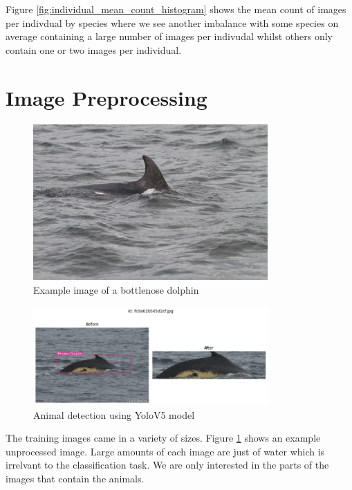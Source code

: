 \documentclass{article}
\begin{document}
Figure \ref{fig:individual_mean_count_histogram} shows the mean count of images per indivdual by species where we see another imbalance with some species on average containing a large number of images per indivudal whilst others only contain one or two images per individual.


\section{Image Preprocessing}

\begin{figure}
    \centering
    \includegraphics[width=0.8\textwidth]{example_train.jpg}
    \caption{Example image of a bottlenose dolphin}
    \label{fig:example_train}
\end{figure}

\begin{figure}
    \centering
    \includegraphics[width=0.8\textwidth]{image_cropping.png}
    \caption{Animal detection using YoloV5 model}
    \label{fig:image_cropping}
\end{figure}


The training images came in a variety of sizes. Figure \ref{fig:example_train} shows an example unprocessed image. Large amounts of each image are just of water which is irrelvant to the classification task. We are only interested in the parts of the 
images that contain the animals.
\end{document}
